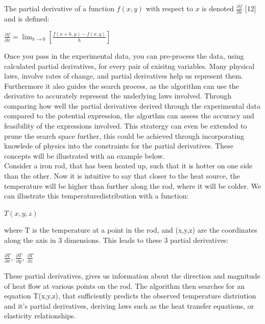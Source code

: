 \documentclass{article}
\begin{document}
The partial derivative of a function $f(x,y)$ with respect to $x$ is denoted $\frac{\partial f}{\partial x}$ [12] and is defined: \\ 

\begin{center}

  $\frac{\partial f}{\partial x} = \lim_{h \to 0} \left[ \frac{f(x+h, y) - f(x,y)}{h} \right]$
\end{center}

Once you pass in the experimental data, you can pre-process the data, using calculated partial derivatives, for every pair of exisitng variables. Many physical laws, involve rates of change, and partial derivatives help us represent them. Furthermore it also guides the search process, as the algorithm can use the derivative to accurately represent the underlying laws involved. Through comparing how well the partial derivatives derived through the experimental data compared to the potential expression, the algorthm can assess the accuracy and feasibility of the expressions involved. This stratergy can even be extended to prune the search space further, this could be achieved through incorporating knowlede of physics into the constraints for the partial derivatives. These concepts will be illustrated with an example below.\\

Consider a iron rod, that has been heated up, such that it is hotter on one side than the other. Now it is intuitive to say that closer to the heat source, the temperature will be higher than further along the rod, where it will be colder. We can illustrate this temperaturedistribution with a function:  \\

\begin{center}
$T(x,y,z)$
\end{center}

where T is the temperature at a point in the rod, and (x,y,z) are the coordinates along the axis in 3 dimensions. This leads to these 3 partial derivatives: \\ 

\begin{center}
 $\frac{\partial T}{\partial x}, \  \frac{\partial T}{\partial y}, \  \frac{\partial T}{\partial z}$
\end{center}

These partial derivatives, gives us information about the direction and magnitude of heat flow at various points on the rod. The algorithm then searches for an equation T(x,y,z), that sufficiently predicts the observed temperature distriution and it's partial derivatives, deriving laws such as the heat transfer equations, or elasticity relationships.\\ 
\end{document}
